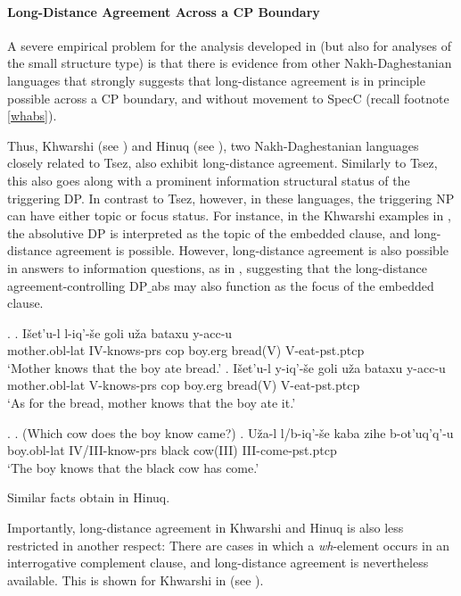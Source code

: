 \documentclass[output=paper
,modfonts
,nonflat]{langsci/langscibook}
\begin{document}
\paragraph{Long-Distance Agreement Across a CP Boundary}

A severe empirical problem for the analysis developed in
\cite{Polinsky&Potsdam:01} (but also for analyses of the small
structure type) is that there is evidence from other Nakh-Daghestanian
languages that strongly suggests that long-distance agreement is in
principle possible across a CP boundary, and without movement to SpecC
(recall footnote \ref{whabs}). 

Thus, Khwarshi (see
\cite{Khalilova09}) and Hinuq (see \cite{Forker:11}), two
Nakh-Daghe\-stanian languages closely related to Tsez,
 also exhibit long-distance agreement. Similarly to Tsez, this
also goes along with a prominent information structural status of the
triggering DP. In contrast to Tsez, however, in these languages, the
triggering NP can have either topic or focus status.
For instance, in the Khwarshi examples in \Next, the 
absolutive DP is interpreted as the topic of the embedded clause, and
long-distance agreement is possible.
However, long-distance agreement is also possible in answers to
information questions, as in \NNext, suggesting that the
long-distance agreement-controlling DP$\_${abs} may also function as the focus of the embedded clause.

\Lsciexi.
\ag.  I\v{s}et'u-l l-iq'-\v{s}e goli u\v{z}a bataxu y-acc-u \\
 mother.{\sc obl-lat} IV-knows-{\sc prs} {\sc cop} boy.{\sc erg}
 bread(V) V-eat-{\sc pst.ptcp} \\
 `Mother knows that the boy ate bread.'
\bg.  I\v{s}et'u-l \label{16-b}y-iq'-\v{s}e goli u\v{z}a bataxu y-acc-u \\
  mother.{\sc obl-lat} V-knows-{\sc prs} {\sc cop} boy.{\sc erg}
  bread(V) V-eat-{\sc pst.ptcp} \\
 `As for the bread, mother knows that  the boy ate it.'

\Lsciexi. 
\a. (Which cow does the boy know came?)
\bg. U\v{z}a-l l/b-iq'-\v{s}e \label{17-b}k\textsuperscript{}aba zihe b-ot'uq'q'-u \\
boy.{\sc obl-lat} IV/III-know-{\sc prs} black cow(III) III-come-{\sc pst.ptcp} \\
 `The boy knows that the black cow has come.'

Similar facts obtain in Hinuq.  

Importantly, long-distance agreement in Khwarshi and Hinuq is also less
restricted in another respect:
There are cases in which a {\em wh}-element occurs in
     an interrogative  complement clause, and long-distance agreement is nevertheless
     available. This is shown for Khwarshi in \Next (see \cite{Khalilova09}). 
\end{document}
